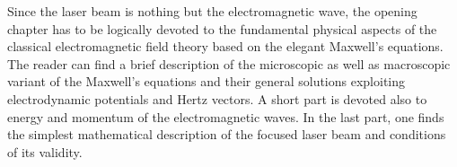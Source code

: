 Since the laser beam is nothing but the electromagnetic wave, the opening chapter has to be logically devoted to the fundamental physical aspects of the classical electromagnetic field theory based on the elegant Maxwell's equations. The reader can find a brief description of the microscopic as well as macroscopic variant of the Maxwell's equations and their general solutions exploiting electrodynamic potentials and Hertz vectors. A short part is devoted also to energy and momentum of the electromagnetic waves. In the last part, one finds the simplest mathematical description of the focused laser beam and conditions of its validity.